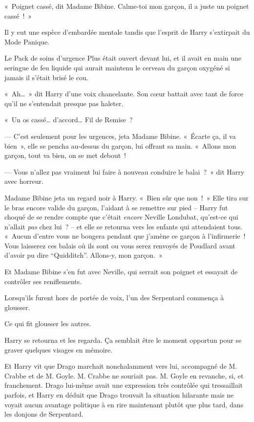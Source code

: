 «~Poignet cassé, dit Madame Bibine. Calme-toi mon garçon, il a juste un poignet cassé~!~»

Il y eut une espèce d'embardée mentale tandis que l'esprit de Harry s'extirpait du Mode Panique.

Le Pack de soins d'urgence Plus était ouvert devant lui, et il avait en main une seringue de feu liquide qui aurait maintenu le cerveau du garçon oxygéné si jamais il s'était brisé le cou.

«~Ah…~» dit Harry d'une voix chancelante. Son cœur battait avec tant de force qu'il ne s'entendait presque pas haleter.

«~Un os cassé… d'accord… Fil de Remise~?

--- C'est seulement pour les urgences, jeta Madame Bibine. «~Écarte ça, il va bien~», elle se pencha au-dessus du garçon, lui offrant sa main. «~Allons mon garçon, tout va bien, on se met debout~!

--- Vous n'allez pas vraiment lui faire à nouveau conduire le balai~?~» dit Harry avec horreur.

Madame Bibine jeta un regard noir à Harry. «~Bien sûr que non~!~» Elle tira sur le bras encore valide du garçon, l'aidant à se remettre sur pied -- Harry fut choqué de se rendre compte que c'était \emph{encore} Neville Londubat, qu'est-ce qui n'allait \emph{pas} chez lui~? -- et elle se retourna vers les enfants qui attendaient tous. «~Aucun d'entre vous ne bougera pendant que j'amène ce garçon à l'infirmerie~! Vous laisserez ces balais où ils sont ou vous serez renvoyés de Poudlard avant d'avoir pu dire “Quidditch”. Allons-y, mon garçon.~»

Et Madame Bibine s'en fut avec Neville, qui serrait son poignet et essayait de contrôler ses reniflements.

Lorsqu'ils furent hors de portée de voix, l'un des Serpentard commença à glousser.

Ce qui fit glousser les autres.

Harry se retourna et les regarda. Ça semblait être le moment opportun pour se graver quelques visages en mémoire.

Et Harry vit que Drago marchait nonchalamment vers lui, accompagné de M. Crabbe et de M. Goyle. M. Crabbe ne souriait pas. M. Goyle en revanche, si, et franchement. Drago lui-même avait une expression très contrôlée qui tressaillait parfois, et Harry en déduit que Drago trouvait la situation hilarante mais ne voyait aucun avantage politique à en rire maintenant plutôt que plus tard, dans les donjons de Serpentard.

